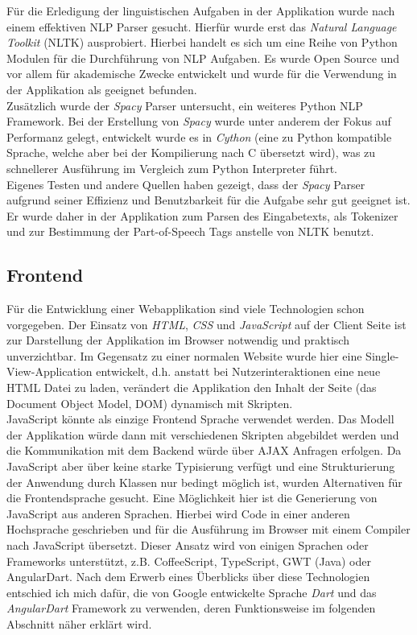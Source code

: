 Für die Erledigung der linguistischen Aufgaben in der Applikation wurde nach einem effektiven NLP Parser gesucht. Hierfür wurde erst das \textit{Natural Language Toolkit} (NLTK)\cite{Bird2004a} ausprobiert. Hierbei handelt es sich um eine Reihe von Python Modulen für die Durchführung von NLP Aufgaben. Es wurde Open Source und vor allem für akademische Zwecke entwickelt und wurde für die Verwendung in der Applikation als geeignet befunden.\\
Zusätzlich wurde der \textit{Spacy} Parser untersucht, ein weiteres Python NLP Framework. Bei der Erstellung von \textit{Spacy} wurde unter anderem der Fokus auf Performanz gelegt, entwickelt wurde es in \textit{Cython} (eine zu Python kompatible Sprache, welche aber bei der Kompilierung nach C übersetzt wird), was zu schnellerer Ausführung im Vergleich zum Python Interpreter führt.\\
Eigenes Testen und andere Quellen haben gezeigt, dass der \textit{Spacy} Parser aufgrund seiner Effizienz\cite{Stent2015} und Benutzbarkeit für die Aufgabe sehr gut geeignet ist. Er wurde daher in der Applikation zum Parsen des Eingabetexts, als Tokenizer und zur Bestimmung der Part-of-Speech Tags anstelle von NLTK benutzt.

\subsection{Frontend}

Für die Entwicklung einer Webapplikation sind viele Technologien schon vorgegeben. Der Einsatz von \textit{HTML}, \textit{CSS} und \textit{JavaScript} auf der Client Seite ist zur Darstellung der Applikation im Browser notwendig und praktisch unverzichtbar. Im Gegensatz zu einer normalen Website wurde hier eine Single-View-Application entwickelt, d.h. anstatt bei Nutzerinteraktionen eine neue HTML Datei zu laden, verändert die Applikation den Inhalt der Seite (das Document Object Model, DOM) dynamisch mit Skripten\cite{mikowski2013single}.\\

JavaScript könnte als einzige Frontend Sprache verwendet werden. Das Modell der Applikation würde dann mit verschiedenen Skripten abgebildet werden und die Kommunikation mit dem Backend würde über AJAX Anfragen erfolgen. Da JavaScript aber über keine starke Typisierung verfügt und eine Strukturierung der Anwendung durch Klassen nur bedingt möglich ist, wurden Alternativen für die Frontendsprache gesucht. Eine Möglichkeit hier ist die Generierung von JavaScript aus anderen Sprachen. Hierbei wird Code in einer anderen Hochsprache geschrieben und für die Ausführung im Browser mit einem Compiler nach JavaScript übersetzt. Dieser Ansatz wird von einigen Sprachen oder Frameworks unterstützt, z.B. CoffeeScript, TypeScript, GWT (Java) oder AngularDart. Nach dem Erwerb eines Überblicks über diese Technologien entschied ich mich dafür, die von Google entwickelte Sprache \textit{Dart} und das \textit{AngularDart} Framework zu verwenden, deren Funktionsweise im folgenden Abschnitt näher erklärt wird.

